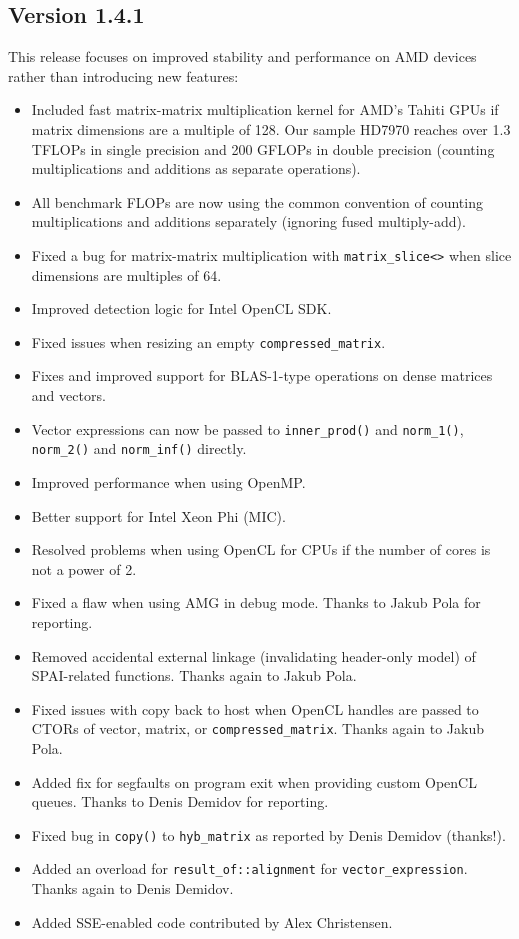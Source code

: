 \subsection*{Version 1.4.1}
This release focuses on improved stability and performance on AMD devices rather than introducing new features:
\begin{itemize}
 \item Included fast matrix-matrix multiplication kernel for AMD's Tahiti GPUs if matrix dimensions are a multiple of 128.
       Our sample HD7970 reaches over 1.3 TFLOPs in single precision and 200 GFLOPs in double precision (counting multiplications and additions as separate operations).
 \item All benchmark FLOPs are now using the common convention of counting multiplications and additions separately (ignoring fused multiply-add).
 \item Fixed a bug for matrix-matrix multiplication with \lstinline|matrix_slice<>| when slice dimensions are multiples of 64.
 \item Improved detection logic for Intel OpenCL SDK.
 \item Fixed issues when resizing an empty \lstinline|compressed_matrix|.
 \item Fixes and improved support for BLAS-1-type operations on dense matrices and vectors.
 \item Vector expressions can now be passed to \lstinline|inner_prod()| and \lstinline|norm_1()|, \lstinline|norm_2()| and \lstinline|norm_inf()| directly.
 \item Improved performance when using OpenMP.
 \item Better support for Intel Xeon Phi (MIC).
 \item Resolved problems when using OpenCL for CPUs if the number of cores is not a power of 2.
 \item Fixed a flaw when using AMG in debug mode. Thanks to Jakub Pola for reporting.
 \item Removed accidental external linkage (invalidating header-only model) of SPAI-related functions. Thanks again to Jakub Pola.
 \item Fixed issues with copy back to host when OpenCL handles are passed to CTORs of vector, matrix, or \lstinline|compressed_matrix|. Thanks again to Jakub Pola.
 \item Added fix for segfaults on program exit when providing custom OpenCL queues. Thanks to Denis Demidov for reporting.
 \item Fixed bug in \lstinline|copy()| to \lstinline|hyb_matrix| as reported by Denis Demidov (thanks!).
 \item Added an overload for \lstinline|result_of::alignment| for \lstinline|vector_expression|. Thanks again to Denis Demidov.
 \item Added SSE-enabled code contributed by Alex Christensen.
\end{itemize}



